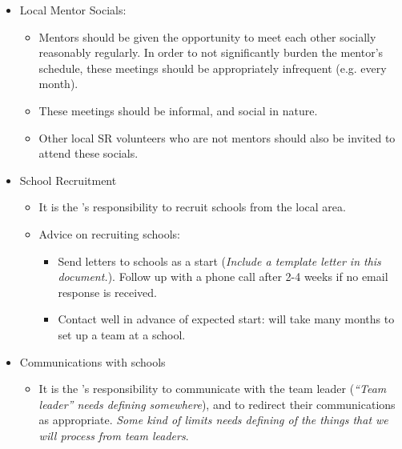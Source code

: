 \begin{itemize}
\item Local Mentor Socials:
  \begin{itemize}
  \item Mentors should be given the opportunity to meet each other socially reasonably regularly.  In order to not significantly burden the mentor's schedule, these meetings should be appropriately infrequent (e.g. every month).
  \item These meetings should be informal, and social in nature.
  \item Other local SR volunteers who are not mentors should also be invited to attend these socials.
  \end{itemize}

\item School Recruitment
  \begin{itemize}
  \item It is the 's responsibility to recruit schools from the local area.
  \item Advice on recruiting schools:
    \begin{itemize}
    \item Send letters to schools as a start (\textit{Include a template letter in this document.}).  Follow up with a phone call after 2-4 weeks if no email response is received.
    \item Contact well in advance of expected start: will take many months to set up a team at a school.
    \end{itemize}
  \end{itemize}

\item Communications with schools
  \begin{itemize}
  \item It is the 's responsibility to communicate with the team leader (\textit{``Team leader'' needs defining somewhere}), and to redirect their communications as appropriate.  \textit{Some kind of limits needs defining of the things that we will process from team leaders}.
  \end{itemize}

\end{itemize}
